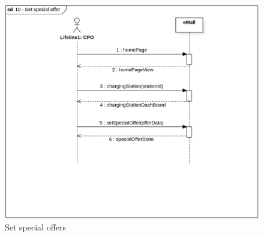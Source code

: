 \begin{figure}[H]
    \begin{center}
        \includegraphics[width=\textwidth]{img/sequence/special.png}
        \caption{Set special offers}
    \end{center}
\end{figure}
\newpage
